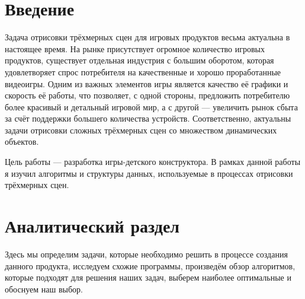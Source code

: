 \documentclass[a4paper,12pt]{report}
\numberwithin{equation}{section}
\begin{document}

\tableofcontents
\vfill

\section*{Введение}
Задача отрисовки трёхмерных сцен для игровых продуктов весьма актуальна в настоящее время. На рынке присутствует огромное количество игровых продуктов, существует отдельная индустрия с большим оборотом, которая удовлетворяет спрос потребителя на качественные и хорошо проработанные видеоигры. Одним из важных элементов игры является качество её графики и скорость её работы, что позволяет, с одной стороны, предложить потребителю более красивый и детальный игровой мир, а с другой --- увеличить рынок сбыта за счёт поддержки большего количества устройств. Соответственно, актуальны задачи отрисовки сложных трёхмерных сцен со множеством динамических объектов.

Цель работы --- разработка игры-детского конструктора. В рамках данной работы я изучил алгоритмы и структуры данных, используемые в процессах отрисовки трёхмерных сцен.

\newpage
\section{Аналитический раздел}
Здесь мы определим задачи, которые необходимо решить в процессе создания данного продукта, исследуем схожие программы, произведём обзор алгоритмов, которые подходят для решения наших задач, выберем наиболее оптимальные и обоснуем наш выбор.
\end{document}
